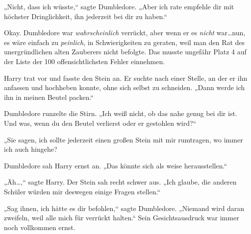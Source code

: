 „Nicht, dass ich wüsste,“ sagte Dumbledore. „Aber ich rate empfehle dir mit höchster Dringlichkeit, ihn jederzeit bei dir zu haben.“

Okay. Dumbledore war \emph{wahrscheinlich} verrückt, aber wenn er es \emph{nicht} war…nun, es wäre einfach zu \emph{peinlich}, in Schwierigkeiten zu geraten, weil man den Rat des unergründlichen alten Zauberers nicht befolgte. Das musste ungefähr Platz 4 auf der Liste der 100 offensichtlichsten Fehler einnehmen.

Harry trat vor und fasste den Stein an. Er suchte nach einer Stelle, an der er ihn anfassen und hochheben konnte, ohne sich selbst zu schneiden. „Dann werde ich ihn in meinen Beutel packen.“

Dumbledore runzelte die Stirn. „Ich weiß nicht, ob das nahe genug bei dir ist. Und was, wenn du den Beutel verlierst oder er gestohlen wird?“

„Sie sagen, ich sollte jederzeit einen großen Stein mit mir rumtragen, wo immer ich auch hingehe?

Dumbledore sah Harry ernst an. „Das könnte sich als weise herausstellen.“

„Äh…,“ sagte Harry. Der Stein sah recht schwer aus. „Ich glaube, die anderen Schüler würden mir deswegen einige Fragen stellen.“

„Sag ihnen, ich hätte es dir befohlen,“ sagte Dumbledore. „Niemand wird daran zweifeln, weil alle mich für verrückt halten.“ Sein Gesichtsausdruck war immer noch vollkommen ernst.

